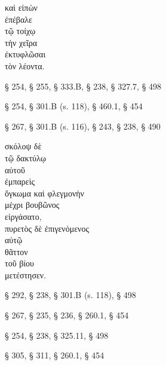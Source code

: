 

{\large
\begin{greek}
\noindent καὶ εἰπὼν \\
ἐπέβαλε \\
\tabto{2em} τῷ τοίχῳ \\
\tabto{2em} τὴν χεῖρα \\
\tabto{2em} ἐκτυφλῶσαι \\
\tabto{4em} τὸν λέοντα.\\

\end{greek}
}

\begin{description}[noitemsep]
\item[εἰπὼν] § 254, § 255, § 333.B, § 238, § 327.7, § 498
\item[ἐπέβαλε] § 254, § 301.B (s. 118), § 460.1, § 454
\item[ἐκτυφλῶσαι] § 267, § 301.B (s. 116), § 243, § 238, § 490%
\end{description}



{\large
\begin{greek}
\noindent σκόλοψ δὲ \\
\tabto{2em} τῷ δακτύλῳ \\
\tabto{4em} αὐτοῦ \\
ἐμπαρεὶς \\
ὄγκωμα καὶ φλεγμονὴν \\
\tabto{2em} μέχρι βουβῶνος \\
εἰργάσατο, \\
πυρετὸς δὲ ἐπιγενόμενος \\
\tabto{2em} αὐτῷ \\
θᾶττον \\
\tabto{2em} τοῦ βίου \\
μετέστησεν.\\

\end{greek}
}

\begin{description}[noitemsep]
\item[ἐμπαρεὶς] § 292, § 238, § 301.B (s. 118), § 498
\item[εἰργάσατο] § 267, § 235, § 236, § 260.1, § 454
\item[ἐπιγενόμενος] § 254, § 238, § 325.11, § 498
\item[μετέστησεν] § 305, § 311, § 260.1, § 454

\end{description}

